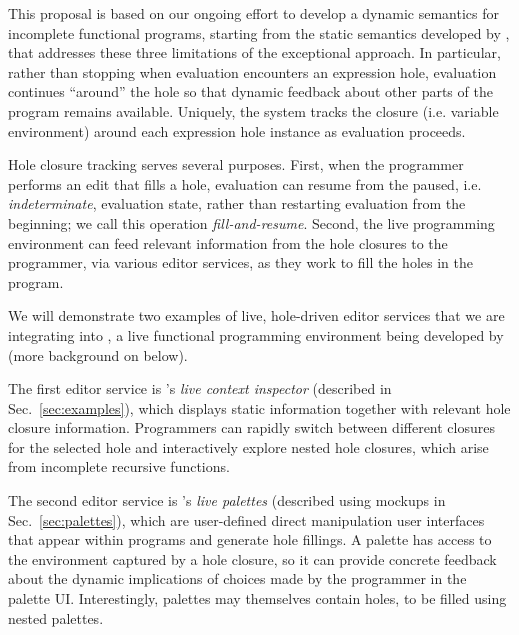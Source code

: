 

This proposal is based on our ongoing effort to develop a dynamic semantics for incomplete functional programs, starting from the static semantics developed by \citet{popl-paper},  that addresses these three limitations of the exceptional approach. 
In particular, rather than stopping when evaluation encounters an expression hole, evaluation continues ``around'' the hole so that dynamic feedback about other parts of the program remains available. 
Uniquely, the system tracks the closure (i.e. variable environment) around each expression hole instance as evaluation proceeds.

Hole closure tracking serves several purposes. 
%
First, when the programmer performs an edit that fills a hole, evaluation can resume from the paused, i.e. \emph{indeterminate}, evaluation state, rather than restarting evaluation from the beginning;
%
we call this operation \emph{fill-and-resume}. 
%
Second, the live programming environment can feed relevant information from the {hole closures} to the programmer, via various editor services, as they work to fill the holes in the program. 


We will demonstrate two examples of live, hole-driven editor services that we are integrating into \Hazel, a live functional programming environment being developed by \citet{HazelnutSNAPL}
(more background on \Hazel below). 

The first editor service is \Hazel's \emph{live context inspector} (described in Sec.~\ref{sec:examples}),
which displays static information together with relevant hole closure information. 
Programmers can rapidly switch between different closures for the selected hole and interactively explore nested hole closures, which arise from incomplete recursive functions.

The second editor service is \Hazel's \emph{live palettes} (described using mockups in Sec.~\ref{sec:palettes}), which are user-defined direct manipulation user interfaces that appear within \Hazel programs and generate hole fillings. 
A palette has access to the environment captured by a hole closure, so it can provide concrete feedback about the dynamic implications of choices made by the programmer in the palette UI.
Interestingly, palettes may themselves contain holes, to be filled using nested palettes.

